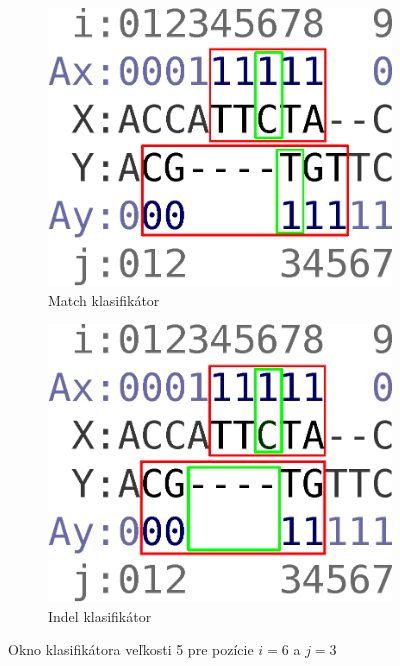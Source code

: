 \begin{figure}[h]
        \centering
        \begin{subfigure}[b]{0.35\textwidth}
                \includegraphics[width=\textwidth]{images/window_m}
                \caption{Match klasifikátor}
                \label{fig:window-m}
        \end{subfigure}%
        \qquad\qquad %
        \begin{subfigure}[b]{0.35\textwidth}
                \includegraphics[width=\textwidth]{images/window_i}
                \caption{Indel klasifikátor}
                \label{fig:window-i}
        \end{subfigure}
        \caption[Okno klasifikátora]{Okno klasifikátora veľkosti 5 pre pozície $i = 6$ a $j = 3$}
\end{figure}

